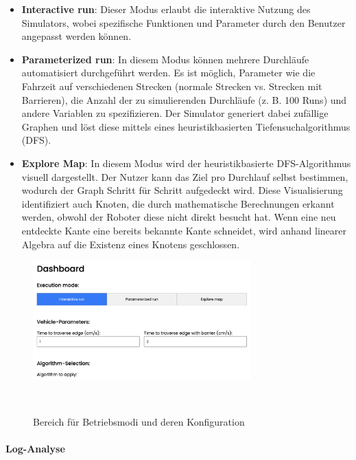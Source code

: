 \documentclass[main.tex]{subfiles} %
\begin{document}
\begin{itemize}
  \item \textbf{Interactive run}:
    Dieser Modus erlaubt die interaktive Nutzung des Simulators,
    wobei spezifische Funktionen und Parameter durch den Benutzer
    angepasst werden können.

  \item \textbf{Parameterized run}:
    In diesem Modus können mehrere Durchläufe automatisiert
    durchgeführt werden. Es ist möglich, Parameter wie die Fahrzeit
    auf verschiedenen Strecken (normale Strecken vs. Strecken mit
    Barrieren), die Anzahl der zu simulierenden Durchläufe (z. B. 100
    Runs) und andere Variablen zu spezifizieren. Der Simulator
    generiert dabei zufällige Graphen und löst diese mittels eines
    heuristikbasierten Tiefensuchalgorithmus (DFS).

  \item \textbf{Explore Map}:
    In diesem Modus wird der heuristikbasierte DFS-Algorithmus
    visuell dargestellt. Der Nutzer kann das Ziel pro Durchlauf
    selbst bestimmen, wodurch der Graph Schritt für Schritt
    aufgedeckt wird. Diese Visualisierung identifiziert auch Knoten,
    die durch mathematische Berechnungen erkannt werden, obwohl der
    Roboter diese nicht direkt besucht hat. Wenn eine neu entdeckte
    Kante eine bereits bekannte Kante schneidet, wird anhand linearer
    Algebra auf die Existenz eines Knotens geschlossen.
\end{itemize}

\begin{figure}[H]
  \centering
  \includegraphics[width=0.75\textwidth]{./fig_Simulation/SimulatorConfig.png}
  \caption{Bereich für Betriebsmodi und deren
  Konfiguration}~\label{fig:DashboardConfig}
\end{figure}

\paragraph{Log-Analyse}
\end{document}
